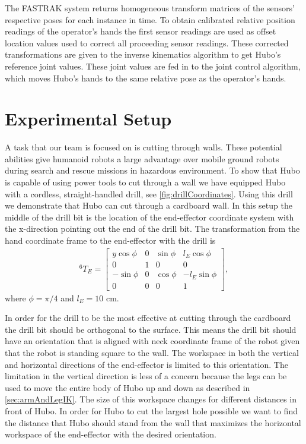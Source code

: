 \documentclass[letterpaper, 10 pt, conference]{IEEEtran}
\begin{document}
The FASTRAK system returns homogeneous transform matrices of the sensors' respective poses for each instance in time. To obtain calibrated relative position readings of the operator's hands the first sensor readings are used as offset location values used to correct all proceeding sensor readings. These corrected transformations are given to the inverse kinematics algorithm to get Hubo's reference joint values. These joint values are fed in to the joint control algorithm, which moves Hubo's hands to the same relative pose as the operator's hands.

\section{Experimental Setup} \label{sec.experimentalSetup}
A task that our team is focused on is cutting through walls. These potential abilities give humanoid robots a large advantage over mobile ground robots during search and rescue missions in hazardous environment. To show that Hubo is capable of using power tools to cut through a wall we have equipped Hubo with a cordless, straight-handled drill, see \cref{fig:drillCoordinates}. Using this drill we demonstrate that Hubo can cut through a cardboard wall. In this setup the middle of the drill bit is the location of the end-effector coordinate system with the x-direction pointing out the end of the drill bit. The transformation from the hand coordinate frame to the end-effector with the drill is 
\begin{align}\label{eq:neckMatrix}
^6T_E= \begin{bmatrix}y
  \cos{\phi}  & 0 & \sin{\phi} & l_{E}\cos{\phi} \\
  0           & 1 & 0          & 0 \\
  -\sin{\phi} & 0 & \cos{\phi} & -l_{E}\sin{\phi} \\
  0           & 0 & 0          & 1
\end{bmatrix},
\end{align}
where $\phi = \pi/4$ and $l_E = 10$ cm.

In order for the drill to be the most effective at cutting through the cardboard the drill bit should be orthogonal to the surface. This means the drill bit should have an orientation that is aligned with neck coordinate frame of the robot given that the robot is standing square to the wall. The workspace in both the vertical and horizontal directions of the end-effector is limited to this orientation. The limitation in the vertical direction is less of a concern because the legs can be used to move the entire body of Hubo up and down as described in \cref{sec:armAndLegIK}. The size of this workspace changes for different distances in front of Hubo. In order for Hubo to cut the largest hole possible we want to find the distance that Hubo should stand from the wall that maximizes the horizontal workspace of the end-effector with the desired orientation.
\end{document}
